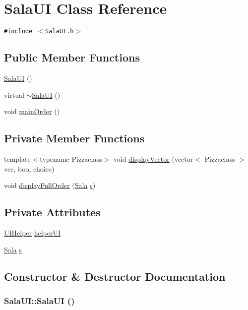 \hypertarget{class_sala_u_i}{
\section{Sala\-UI Class Reference}
\label{class_sala_u_i}
}
{\tt \#include $<$Sala\-UI.h$>$}

\subsection*{Public Member Functions}
\begin{CompactItemize}
\item 
\hyperlink{class_sala_u_i_2fd138dfa2c3efa7c8ca6864147e5d04}{Sala\-UI} ()
\item 
virtual \hyperlink{class_sala_u_i_5ec383a7722b1f6b7425e115471dbfdf}{$\sim$Sala\-UI} ()
\item 
void \hyperlink{class_sala_u_i_d30e21f7319d652c2a2fd88dc274cfbc}{main\-Order} ()
\end{CompactItemize}
\subsection*{Private Member Functions}
\begin{CompactItemize}
\item 
template$<$typename Pizzaclass$>$ void \hyperlink{class_sala_u_i_4ea2f17c1ceb659e1244e7d7330cdee5}{display\-Vector} (vector$<$ Pizzaclass $>$ vec, bool choice)
\item 
void \hyperlink{class_sala_u_i_ffacd1a3478484249d40a5ed5dc731da}{display\-Full\-Order} (\hyperlink{class_sala}{Sala} \hyperlink{class_sala_u_i_03c7c0ace395d80182db07ae2c30f034}{s})
\end{CompactItemize}
\subsection*{Private Attributes}
\begin{CompactItemize}
\item 
\hyperlink{class_u_i_helper}{UIHelper} \hyperlink{class_sala_u_i_165ca02db075e280199e0970e3465900}{helper\-UI}
\item 
\hyperlink{class_sala}{Sala} \hyperlink{class_sala_u_i_03c7c0ace395d80182db07ae2c30f034}{s}
\end{CompactItemize}


\subsection{Constructor \& Destructor Documentation}
\hypertarget{class_sala_u_i_2fd138dfa2c3efa7c8ca6864147e5d04}{
\subsubsection[SalaUI]{\setlength{\rightskip}{0pt plus 5cm}Sala\-UI::Sala\-UI ()}}
\label{class_sala_u_i_2fd138dfa2c3efa7c8ca6864147e5d04}


